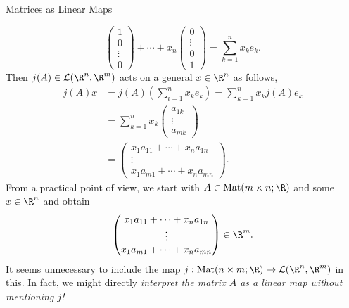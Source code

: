 \documentclass[smaller,hyperref={CJKbookmarks=true}]{beamer}
\begin{document}
\begin{frame}{Matrices as Linear Maps}
\begin{spacing}{1}
\[\begin{pmatrix}
                       1 \\
                       0 \\
                       \vdots \\
                       0
                     \end{pmatrix}+\cdots+x_n\begin{pmatrix}
                                               0 \\
                                               \vdots \\
                                               0 \\
                                               1
                                             \end{pmatrix}=\sum_{k=1}^{n}x_ke_k.\]
\newpage
Then $j(A)\in\mathcal{L}(\R^n,\R^m)$ acts on a general $x\in\R^n$ as follows,
\begin{equation*}
  \begin{split}
     j(A)x &=j(A)\left(\sum_{i=1}^{n}x_ke_k\right)=\sum_{k=1}^{n}x_kj(A)e_k  \\
           &=\sum_{k=1}^{n}x_k\begin{pmatrix}
                                a_{1k} \\
                                \vdots \\
                                a_{mk}
                              \end{pmatrix}  \\
           &=\begin{pmatrix}
               x_1a_{11}+\cdots+x_na_{1n} \\
               \vdots \\
               x_1a_{m1}+\cdots+x_na_{mn}
             \end{pmatrix}.
  \end{split}
\end{equation*}
\newpage
From a practical point of view, we start with $A\in\text{Mat}(m\times n;\R)$ and some $x\in\R^n$ and obtain
\[\begin{pmatrix}
               x_1a_{11}+\cdots+x_na_{1n} \\
               \vdots \\
               x_1a_{m1}+\cdots+x_na_{mn}
             \end{pmatrix}\in\R^m.\]
It seems unnecessary to include the map $j:\text{Mat}(n\times m;\R)\to\mathcal{L}(\R^n,\R^m)$ in this. In fact, we might directly\emph{ interpret the matrix $A$ as a linear map without mentioning $j$!}\\[11pt]

\end{spacing}
\end{frame}
\end{document}

